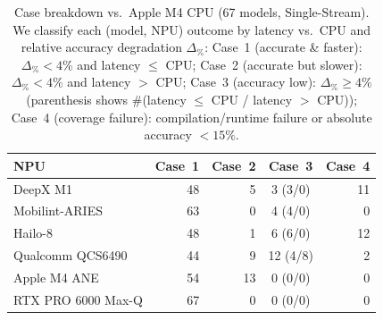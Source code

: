 \begin{table}[tb]
\caption{Case breakdown vs.\ Apple M4 CPU (67 models, Single-Stream).
We classify each (model, NPU) outcome by latency vs.\ CPU and relative accuracy degradation $\Delta_{\%}$:
Case~1 (accurate \& faster): $\Delta_{\%}<4\%$ and latency $\leq$ CPU;
Case~2 (accurate but slower): $\Delta_{\%}<4\%$ and latency $>$ CPU;
Case~3 (accuracy low): $\Delta_{\%}\geq 4\%$ (parenthesis shows \#(latency $\leq$ CPU / latency $>$ CPU));
Case~4 (coverage failure): compilation/runtime failure or absolute accuracy $<15\%$.}
\label{tab:case_breakdown_67}
\centering
\small
\setlength{\tabcolsep}{4pt} 
\begin{tabular}{lrrcr}
\toprule
NPU & Case~1 & Case~2 & Case~3 & Case~4 \\
\midrule
DeepX M1 & 48 & 5 & 3 (3/0) & 11 \\
Mobilint-ARIES & 63 & 0 & 4 (4/0) & 0 \\
Hailo-8 & 48 & 1 & 6 (6/0) & 12 \\
Qualcomm QCS6490 & 44 & 9 & 12 (4/8) & 2 \\
Apple M4 ANE & 54 & 13 & 0 (0/0) & 0 \\
RTX PRO 6000 Max-Q & 67 & 0 & 0 (0/0) & 0 \\
\bottomrule
\end{tabular}
\end{table}


%
